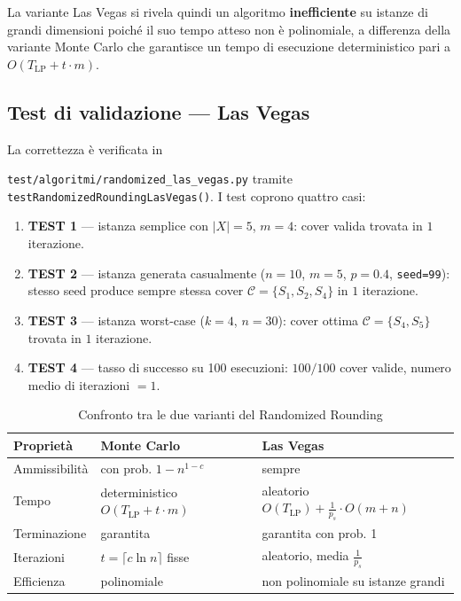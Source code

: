 \documentclass[12pt, a4paper]{article}
\begin{document}
La variante Las Vegas si rivela quindi un algoritmo \textbf{inefficiente} su istanze di 
grandi dimensioni poiché il suo tempo atteso non \`e polinomiale, a differenza della variante 
Monte Carlo che garantisce un tempo di esecuzione 
deterministico pari a $O(T_{\text{LP}} + t \cdot m)$.



\subsection*{Test di validazione — Las Vegas}

La correttezza \`e verificata in 

\texttt{test/algoritmi/randomized\_las\_vegas.py}
tramite 
\texttt{testRandomizedRoundingLasVegas()}. 
I test coprono quattro casi:

\begin{enumerate}
    \item \textbf{TEST 1} — istanza semplice con $|X|=5$, $m=4$:
    cover valida trovata in $1$ iterazione.

    \item \textbf{TEST 2} — istanza generata casualmente ($n=10$, $m=5$,
    $p=0.4$, \texttt{seed=99}): stesso seed produce sempre stessa cover
    $\mathcal{C} = \{S_1, S_2, S_4\}$ in $1$ iterazione.

    \item \textbf{TEST 3} — istanza worst-case ($k=4$, $n=30$):
    cover ottima $\mathcal{C} = \{S_4, S_5\}$ trovata in $1$ iterazione.

    \item \textbf{TEST 4} — tasso di successo su 100 esecuzioni:
    $100/100$ cover valide, numero medio di iterazioni $= 1$.
\end{enumerate}

\begin{table}[H]
\centering
\caption{Confronto tra le due varianti del Randomized Rounding}
\label{tab:mc_vs_lv}
\begin{tabular}{lll}
\toprule
Propriet\`a & Monte Carlo & Las Vegas \\
\midrule
Ammissibilità & con prob. $1 - n^{1-c}$ & sempre \\
Tempo & deterministico $O(T_{\text{LP}} + t \cdot m)$ & aleatorio $O(T_{\text{LP}}) + \frac{1}{p_s} \cdot O(m+n)$ \\
Terminazione & garantita & garantita con prob. 1 \\
Iterazioni & $t = \lceil c \ln n \rceil$ fisse & aleatorio, media $\frac{1}{p_s}$ \\
Efficienza & polinomiale & non polinomiale su istanze grandi \\
\bottomrule
\end{tabular}
\end{table}
\end{document}
